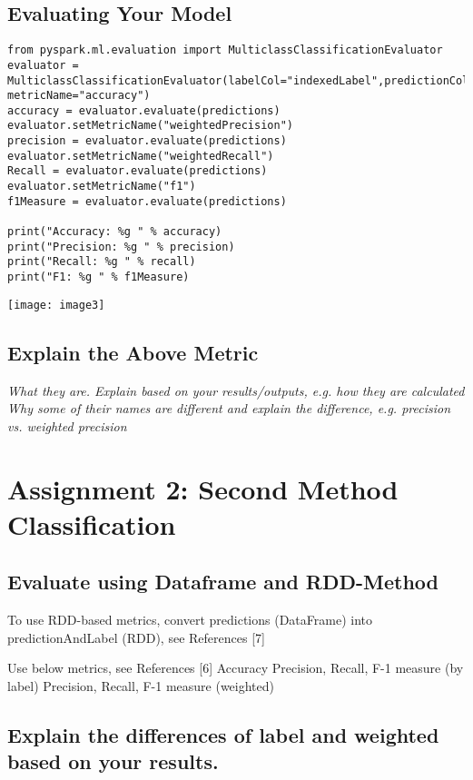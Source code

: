 \documentclass[]{article}
\begin{document}
\subsection*{Evaluating Your Model}
\begin{verbatim}
from pyspark.ml.evaluation import MulticlassClassificationEvaluator
evaluator = MulticlassClassificationEvaluator(labelCol="indexedLabel",predictionCol="prediction", metricName="accuracy")
accuracy = evaluator.evaluate(predictions)
evaluator.setMetricName("weightedPrecision")
precision = evaluator.evaluate(predictions)
evaluator.setMetricName("weightedRecall")
Recall = evaluator.evaluate(predictions)
evaluator.setMetricName("f1")
f1Measure = evaluator.evaluate(predictions)

print("Accuracy: %g " % accuracy)
print("Precision: %g " % precision)
print("Recall: %g " % recall)
print("F1: %g " % f1Measure)
\end{verbatim}
\texttt{[image: image3]}

\subsection*{Explain the Above Metric}
\emph{What they are. Explain based on your results/outputs, e.g. how they are calculated
Why some of their names are different and explain the difference, e.g. precision vs. weighted precision} \vspace{2em}



\section*{Assignment 2: Second Method Classification}

\subsection*{Evaluate using Dataframe and RDD-Method}
To use RDD-based metrics, convert predictions (DataFrame) into predictionAndLabel (RDD), see References [7]

Use below metrics, see References [6]
	Accuracy
	Precision, Recall, F-1 measure (by label)
	Precision, Recall, F-1 measure (weighted)

\subsection*{Explain the differences of label and weighted based on your results.}
\end{document}
